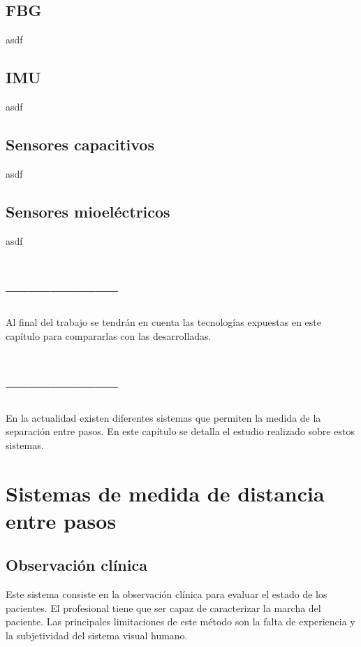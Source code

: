 \subsection{FBG}
\label{sec:fbg2}
asdf

\subsection{IMU}
\label{sec:imu2}
asdf

\subsection{Sensores capacitivos}
\label{sec:capacitivos2}
asdf

\subsection{Sensores mioeléctricos}
\label{sec:mioelectricos2}
asdf


\section{---------------}

Al final del trabajo se tendrán en cuenta las  tecnologías expuestas en este capítulo para compararlas con las desarrolladas.
\cite{citaPruebaMiri}

\section{---------------}

En la actualidad existen diferentes sistemas que permiten la medida de la separación entre pasos. En este capítulo se detalla el estudio realizado sobre estos sistemas.

\section{Sistemas de medida de distancia entre pasos}
	\subsection{Observación clínica}
	Este sistema consiste en la observación clínica para evaluar el estado de los pacientes. El profesional tiene que ser capaz de caracterizar la marcha del paciente. Las principales limitaciones de este método son la falta de experiencia y la subjetividad del sistema visual humano. 
	
